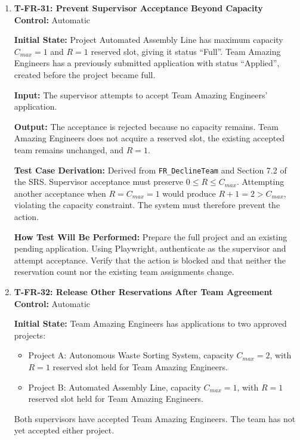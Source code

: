 \documentclass[12pt, titlepage]{article}
\begin{document}
\begin{enumerate}
\textbf{How Test Will Be Performed:}
Configure the project with two reserved slots and Team Fantastic Coders as one of the accepted teams. Using Playwright, authenticate as Team Fantastic Coders and withdraw its application. Verify the withdrawal status, released slot, and change from ``Full'' to ``Open''.

\item \label{T-FR-31}\textbf{T-FR-31: Prevent Supervisor Acceptance Beyond Capacity}\\

\textbf{Control:} Automatic

\textbf{Initial State:} Project Automated Assembly Line has maximum capacity $C_{max} = 1$ and $R = 1$ reserved slot, giving it status ``Full''. Team Amazing Engineers has a previously submitted application with status ``Applied'', created before the project became full.

\textbf{Input:} The supervisor attempts to accept Team Amazing Engineers' application.

\textbf{Output:} The acceptance is rejected because no capacity remains. Team Amazing Engineers does not acquire a reserved slot, the existing accepted team remains unchanged, and $R=1$.

\textbf{Test Case Derivation:} Derived from \texttt{FR\_DeclineTeam} and Section 7.2 of the SRS. Supervisor acceptance must preserve $0 \leq R \leq C_{max}$. Attempting another acceptance when $R = C_{max} = 1$ would produce $R + 1 = 2 > C_{max}$, violating the capacity constraint. The system must therefore prevent the action.

\textbf{How Test Will Be Performed:} Prepare the full project and an existing pending application. Using Playwright, authenticate as the supervisor and attempt acceptance. Verify that the action is blocked and that neither the reservation count nor the existing team assignments change.

\item \label{T-FR-32}\textbf{T-FR-32: Release Other Reservations After Team Agreement}\\

\textbf{Control:} Automatic

\textbf{Initial State:} Team Amazing Engineers has applications to two approved projects:
\begin{itemize}
    \item Project A: Autonomous Waste Sorting System, capacity $C_{max}=2$, with $R=1$ reserved slot held for Team Amazing Engineers.
    \item Project B: Automated Assembly Line, capacity $C_{max}=1$, with $R=1$ reserved slot held for Team Amazing Engineers.
\end{itemize}
Both supervisors have accepted Team Amazing Engineers. The team has not yet accepted either project.


\end{enumerate}
\end{document}
